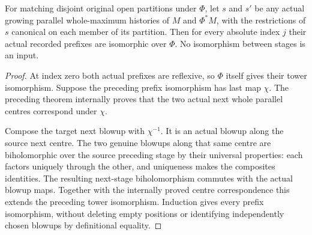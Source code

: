 \begin{theorem}
\label{hir:componentwise-parallel-history-choice-independence}
\leanok
For matching disjoint original open partitions under $\Phi$, let
$s$ and $s'$ be any actual growing parallel whole-maximum histories
of $M$ and $\Phi^*M$, with the restrictions of $s$ canonical on
each member of its partition. Then for every absolute index $j$
their actual recorded prefixes are isomorphic over $\Phi$.
No isomorphism between stages is an input.
\end{theorem}
\begin{proof}
At index zero both actual prefixes are reflexive, so $\Phi$
itself gives their tower isomorphism. Suppose the preceding
prefix isomorphism has last map $\chi$. The preceding theorem
internally proves that the two actual next whole parallel
centres correspond under $\chi$.

Compose the target next blowup with $\chi^{-1}$. It is an
actual blowup along the source next centre. The two genuine
blowups along that same centre are biholomorphic over the
source preceding stage by their universal properties: each
factors uniquely through the other, and uniqueness makes
the composites identities. The resulting next-stage
biholomorphism commutes with the actual blowup maps. Together
with the internally proved centre correspondence this extends
the preceding tower isomorphism. Induction gives every prefix
isomorphism, without deleting empty positions or identifying
independently chosen blowups by definitional equality.
\end{proof}

